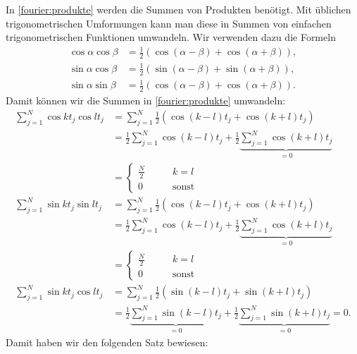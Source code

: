 In \eqref{fourier:produkte} werden die Summen von Produkten benötigt.
Mit üblichen trigonometrischen Umformungen kann man diese in Summen
von einfachen trigonometrischen Funktionen umwandeln.
Wir verwenden dazu die Formeln
\begin{align}
\cos\alpha\cos\beta
&=
\frac12(\cos(\alpha-\beta)+\cos(\alpha+\beta)),
\label{fourier:coscos}
\\
\sin\alpha\cos\beta
&=
\frac12(\sin(\alpha-\beta) + \sin(\alpha+\beta)),
\label{fourier:sincos}
\\
\sin\alpha\sin\beta
&=
\frac12(\cos(\alpha-\beta) + \cos(\alpha+\beta)).
\label{fourier:sinsin}
\end{align}
Damit können wir die Summen in \eqref{fourier:produkte} umwandeln:
\begin{align*}
\sum_{j=1}^N \cos kt_j\cos lt_j
&=
\sum_{j=1}^N \frac12(\cos (k-l)t_j +\cos(k+l)t_j)
\\
&=
\frac12\sum_{j=1}^N \cos (k-l)t_j
+ \frac12\underbrace{\sum_{j=1}^N\cos(k+l)t_j}_{\displaystyle=0}
\\
&=
\begin{cases}
\displaystyle\frac{N}2&\qquad k=l\\
0&\qquad\text{sonst}
\end{cases}
\\
\sum_{j=1}^N \sin kt_j \sin lt_j
&=
\sum_{j=1}^N \frac12(\cos(k-l)t_j +\cos(k+l)t_j)
\\
&=\frac12\sum_{j=1}^N \cos(k-l)t_j
+\frac12\underbrace{\sum_{j=1}^N \cos(k+l)t_j}_{\displaystyle=0}
\\
&=
\begin{cases}
\displaystyle\frac{N}2&\qquad k=l\\
0&\qquad\text{sonst}
\end{cases}
\\
\sum_{j=1}^N \sin kt_j \cos lt_j
&=
\sum_{j=1}^N \frac12(\sin(k-l)t_j +\sin(k+l)t_j)
\\
&=
\frac12\underbrace{\sum_{j=1}^N \sin(k-l)t_j}_{\displaystyle=0}
+
\frac12\underbrace{\sum_{j=1}^N \sin(k+l)t_j}_{\displaystyle=0}
=0.
\end{align*}
Damit haben wir den folgenden Satz bewiesen:

